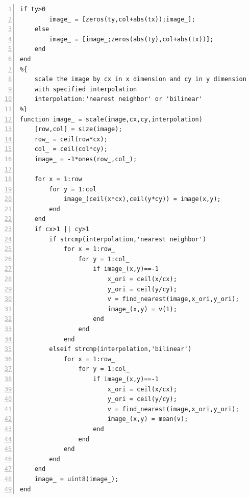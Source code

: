 \documentclass[11pt,oneside]{book}
\begin{document}
\begin{appendices}
\begin{lstlisting}[numbers=left, numberstyle=\tiny,keywordstyle=\color{blue!70},commentstyle=\color{red!50!green!50!blue!50},frame=shadowbox, rulesepcolor=\color{red!20!green!20!blue!20}]
    if ty>0
        image_ = [zeros(ty,col+abs(tx));image_];
    else
        image_ = [image_;zeros(abs(ty),col+abs(tx))];
    end
end
%{ 
    scale the image by cx in x dimension and cy in y dimension
    with specified interpolation
    interpolation:'nearest neighbor' or 'bilinear'
%}
function image_ = scale(image,cx,cy,interpolation)
    [row,col] = size(image);
    row_ = ceil(row*cx);
    col_ = ceil(col*cy);
    image_ = -1*ones(row_,col_);
    
    for x = 1:row
        for y = 1:col
            image_(ceil(x*cx),ceil(y*cy)) = image(x,y);
        end
    end
    if cx>1 || cy>1
        if strcmp(interpolation,'nearest neighbor')
            for x = 1:row_
                for y = 1:col_
                    if image_(x,y)==-1
                        x_ori = ceil(x/cx);
                        y_ori = ceil(y/cy);
                        v = find_nearest(image,x_ori,y_ori);
                        image_(x,y) = v(1);
                    end
                end
            end
        elseif strcmp(interpolation,'bilinear')
            for x = 1:row_
                for y = 1:col_
                    if image_(x,y)==-1
                        x_ori = ceil(x/cx);
                        y_ori = ceil(y/cy);
                        v = find_nearest(image,x_ori,y_ori);
                        image_(x,y) = mean(v);
                    end
                end
            end
        end
    end
    image_ = uint8(image_);
end
\end{lstlisting}

\end{appendices}
\end{document}
